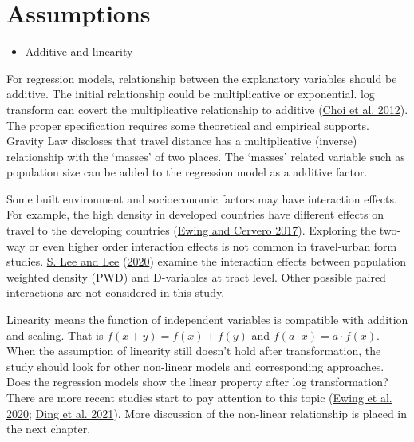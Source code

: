\documentclass[
  11pt,
  openany]{memoir}
\providecommand{\tightlist}{%
  \setlength{\itemsep}{0pt}\setlength{\parskip}{0pt}}
\begin{document}
\hypertarget{assumptions}{%
\section{Assumptions}\label{assumptions}}

\begin{itemize}
\tightlist
\item
  Additive and linearity
\end{itemize}

For regression models, relationship between the explanatory variables should be additive.
The initial relationship could be multiplicative or exponential. log transform can covert the multiplicative relationship to additive (\protect\hyperlink{ref-choiAnalysisMetroRidership2012}{Choi et al. 2012}).
The proper specification requires some theoretical and empirical supports.
Gravity Law discloses that travel distance has a multiplicative (inverse) relationship with the `masses' of two places. The `masses' related variable such as population size can be added to the regression model as a additive factor.

Some built environment and socioeconomic factors may have interaction effects. For example, the high density in developed countries have different effects on travel to the developing countries (\protect\hyperlink{ref-ewingDoesCompactDevelopment2017}{Ewing and Cervero 2017}).
Exploring the two-way or even higher order interaction effects is not common in travel-urban form studies.
\protect\hyperlink{ref-leeComparingImpactsLocal2020}{S. Lee and Lee} (\protect\hyperlink{ref-leeComparingImpactsLocal2020}{2020}) examine the interaction effects between population weighted density (PWD) and D-variables at tract level. Other possible paired interactions are not considered in this study.

Linearity means the function of independent variables is compatible with addition and scaling.
That is \(f(x+y)=f(x)+f(y)\) and \(f(a\cdot x)=a\cdot f(x)\).
When the assumption of linearity still doesn't hold after transformation, the study should look for other non-linear models and corresponding approaches.
Does the regression models show the linear property after log transformation?
There are more recent studies start to pay attention to this topic (\protect\hyperlink{ref-ewingReducingVehicleMiles2020}{Ewing et al. 2020}; \protect\hyperlink{ref-dingNonlinearAssociationsZonal2021}{Ding et al. 2021}). More discussion of the non-linear relationship is placed in the next chapter.
\end{document}
